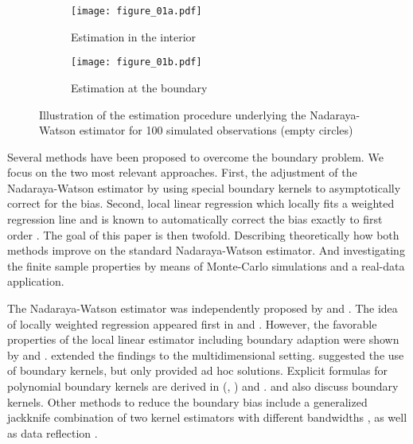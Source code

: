\begin{figure}
	\centering
	\begin{subfigure}{0.75\textwidth}
		\centering
		\texttt{[image: figure\_01a.pdf]}
		\caption{Estimation in the interior}
		\label{fig:nw_interior}
	\end{subfigure}

	\begin{subfigure}{0.75\textwidth}
		\centering
		\texttt{[image: figure\_01b.pdf]}
		\caption{Estimation at the boundary}
		\label{fig:nw_boundary}
	\end{subfigure}
	\caption{Illustration of the estimation procedure underlying the Nadaraya-Watson estimator for 100 simulated observations (empty circles)}
	\label{fig:nw}
\end{figure}

Several methods have been proposed to overcome the boundary problem.
We focus on the two most relevant approaches.
First, the adjustment of the Nadaraya-Watson estimator by using special boundary kernels to asymptotically correct for the bias.
Second, local linear regression which locally fits a weighted regression line and is known to automatically correct the bias exactly to first order \parencite{Hastie_1993}.
The goal of this paper is then twofold.
Describing theoretically how both methods improve on the standard Nadaraya-Watson estimator.
And investigating the finite sample properties by means of Monte-Carlo simulations and a real-data application.

The Nadaraya-Watson estimator was independently proposed by \textcite{Nadaraya_1964} and \textcite{Watson_1964}.
The idea of locally weighted regression appeared first in \textcite{Stone_1977} and \textcite{Cleveland_1979}.
However, the favorable properties of the local linear estimator including boundary adaption were shown by
\textcite{Fan_1992} and \textcite{Fan_Gijbels_1992}.
\textcite{Ruppert_1994} extended the findings to the multidimensional setting.
\textcite{Gasser_1979} suggested the use of boundary kernels, but only provided ad hoc solutions.
Explicit formulas for polynomial boundary kernels are derived in \citeauthor{Müller_1991} (\citeyear{Müller_1991}, \citeyear{Müller_1993}) and \textcite{Müller_1994}.
\textcite{Gasser_1985} and \textcite{Granovsky_1991} also discuss boundary kernels.
Other methods to reduce the boundary bias include a generalized jackknife combination of two kernel estimators with different bandwidths
\parencite{Rice_1984, Kyung-Joon_1998}, as well as data reflection \parencite{Hall_1991}.

